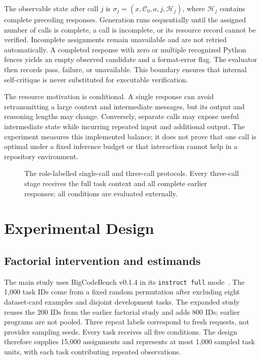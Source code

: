 The observable state after call $j$ is $\sigma_j=(x,\mathcal{C}_0,a,j,\mathcal{H}_j)$, where $\mathcal{H}_j$ contains complete preceding responses. Generation runs sequentially until the assigned number of calls is complete, a call is incomplete, or its resource record cannot be verified. Incomplete assignments remain unavailable and are not retried automatically. A completed response with zero or multiple recognized Python fences yields an empty observed candidate and a format-error flag. The evaluator then records pass, failure, or unavailable. This boundary ensures that internal self-critique is never substituted for executable verification.

The resource motivation is conditional. A single response can avoid retransmitting a large context and intermediate messages, but its output and reasoning lengths may change. Conversely, separate calls may expose useful intermediate state while incurring repeated input and additional output. The experiment measures this implemented balance; it does not prove that one call is optimal under a fixed inference budget or that interaction cannot help in a repository environment.

\begin{figure}[t]
\centering

\caption{The role-labelled single-call and three-call protocols. Every three-call stage receives the full task context and all complete earlier responses; all conditions are evaluated externally.}
\label{fig:core}
\end{figure}

\section{Experimental Design}
\subsection{Factorial intervention and estimands}
The main study uses BigCodeBench v0.1.4 in its \texttt{instruct full} mode~\cite{zhuo2024bigcodebench}. The 1,000 task IDs come from a fixed random permutation after excluding eight dataset-card examples and disjoint development tasks. The expanded study reuses the 200 IDs from the earlier factorial study and adds 800 IDs; earlier programs are not pooled. Three repeat labels correspond to fresh requests, not provider sampling seeds. Every task receives all five conditions. The design therefore supplies 15,000 assignments and represents at most 1,000 sampled task units, with each task contributing repeated observations.

